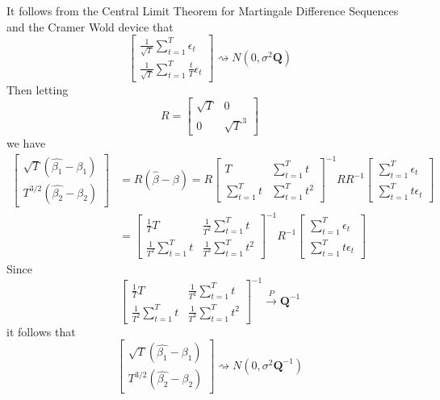 \documentclass[11pt]{article}
\begin{document}
It follows from the Central Limit Theorem for Martingale Difference Sequences and the Cramer Wold device that
\begin{equation}
\left[ \begin{matrix}
\frac{1}{\sqrt{T}} \sum_{t=1}^T \epsilon_t \\
\frac{1}{\sqrt{T}} \sum_{t=1}^T \frac{t}{T} \epsilon_t
\end{matrix} \right] \rightsquigarrow N \left( 0, \sigma^2 \mathbf{Q} \right)
\end{equation}
Then letting
\begin{equation}
R = \left[
\begin{matrix}
\sqrt{T} & 0 \\
0 & \sqrt{T}^3
\end{matrix}
\right]
\end{equation}
we have
\begin{equation}
\begin{split}
\left[
\begin{matrix}
\sqrt{T} \left( \widehat{\beta_1} - \beta_1 \right) \\
T^{3/2} \left( \widehat{\beta_2} - \beta_2 \right)
\end{matrix}
\right]
& = R \left( \widehat{\beta} - \beta \right)
= R \left[
\begin{matrix}
T & \sum_{t=1}^T t \\
\sum_{t=1}^T t & \sum_{t=1}^T t^2
\end{matrix}
\right]^{-1} R R^{-1}
\left[
\begin{matrix}
\sum_{t=1}^T \epsilon_t \\
\sum_{t=1}^T t \epsilon_t
\end{matrix}
\right] \\
& = \left[
\begin{matrix}
\frac{1}{T} T & \frac{1}{T^2} \sum_{t=1}^T t \\
\frac{1}{T^2} \sum_{t=1}^T t & \frac{1}{T^3} \sum_{t=1}^T t^2
\end{matrix}
\right]^{-1}
R^{-1}
\left[
\begin{matrix}
\sum_{t=1}^T \epsilon_t \\
\sum_{t=1}^T t \epsilon_t
\end{matrix}
\right]
\end{split}
\end{equation}
Since
\begin{equation}
\left[
\begin{matrix}
\frac{1}{T} T & \frac{1}{T^2} \sum_{t=1}^T t \\
\frac{1}{T^2} \sum_{t=1}^T t & \frac{1}{T^3} \sum_{t=1}^T t^2
\end{matrix}
\right]^{-1} \overset{P}{\rightarrow} \mathbf{Q}^{-1}
\end{equation}
it follows that
\begin{equation}
\left[
\begin{matrix}
\sqrt{T} \left( \widehat{\beta_1} - \beta_1 \right) \\
T^{3/2} \left( \widehat{\beta_2} - \beta_2 \right)
\end{matrix}
\right] \rightsquigarrow N \left( 0 , \sigma^2 \mathbf{Q}^{-1} \right)
\end{equation}
\end{document}
